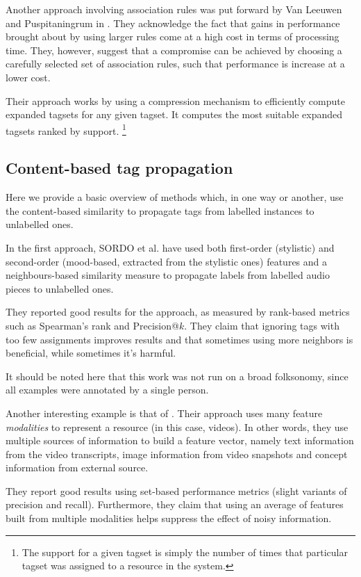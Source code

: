 Another approach involving association rules was put forward by Van Leeuwen and Puspitaningrum in \citeyear{vanleeuwen_puspitaningrum_2012}. They acknowledge the fact that gains in performance brought about by using larger rules come at a high cost in terms of processing time. They, however, suggest that a compromise can be achieved by choosing a carefully selected set of association rules, such that performance is increase at a lower cost.

Their approach works by using a compression mechanism to efficiently compute expanded tagsets for any given tagset. It computes the most suitable expanded tagsets ranked by support. \footnote{The support for a given tagset is simply the number of times that particular tagset was assigned to a resource in the system.}

\subsection{Content-based tag propagation}

Here we provide a basic overview of methods which, in one way or another, use the content-based similarity to propagate tags from labelled instances to unlabelled ones.

In the first approach, SORDO et al. \citeyearpar{sordo_etal_2007} have used both first-order (stylistic) and second-order (mood-based, extracted from the stylistic ones) features and a neighbours-based similarity measure to propagate labels from labelled audio pieces to unlabelled ones.

They reported good results for the approach, as measured by rank-based metrics such as Spearman's rank and Precision@$k$. They claim that ignoring tags with too few assignments improves results and that sometimes using more neighbors is beneficial, while sometimes it's harmful.

It should be noted here that this work was not run on a broad folksonomy, since all examples were annotated by a single person.

Another interesting example is that of \cite{moxley_etal_2008}. Their approach uses many feature \textit{modalities} to represent a resource (in this case, videos). In other words, they use multiple sources of information to build a feature vector, namely text information from the video transcripts, image information from video snapshots and concept information from external source.

They report good results using set-based performance metrics (slight variants of precision and recall). Furthermore, they claim that using an average of features built from multiple modalities helps suppress the effect of noisy information.


